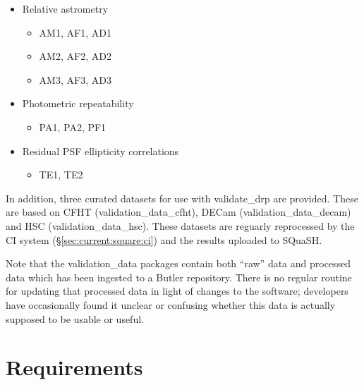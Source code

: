 \documentclass[DM,authoryear,toc,lsstdraft]{lsstdoc}
\begin{document}
\begin{itemize}
\item{Relative astrometry
  \begin{itemize}
    \item{AM1, AF1, AD1}
    \item{AM2, AF2, AD2}
    \item{AM3, AF3, AD3}
  \end{itemize}
}
\item{Photometric repeatability
  \begin{itemize}
    \item{PA1, PA2, PF1}
  \end{itemize}
}
\item{Residual PSF ellipticity correlations
  \begin{itemize}
    \item{TE1, TE2}
  \end{itemize}
}
\end{itemize}

In addition, three curated datasets for use with validate\_drp are provided.
These are based on CFHT (validation\_data\_cfht), DECam
(validation\_data\_decam) and HSC (validation\_data\_hsc). These datasets are
reguarly reprocessed by the CI system (\S\ref{sec:current:square:ci}) and the
results uploaded to SQuaSH.

Note that the validation\_data packages contain both ``raw'' data and
processed data which has been ingested to a Butler repository. There is no
regular routine for updating that processed data in light of changes to the
software; developers have occasionally found it unclear or confusing whether
this data is actually supposed to be usable or useful.

\section{Requirements}
\label{sec:req}



\end{document}
